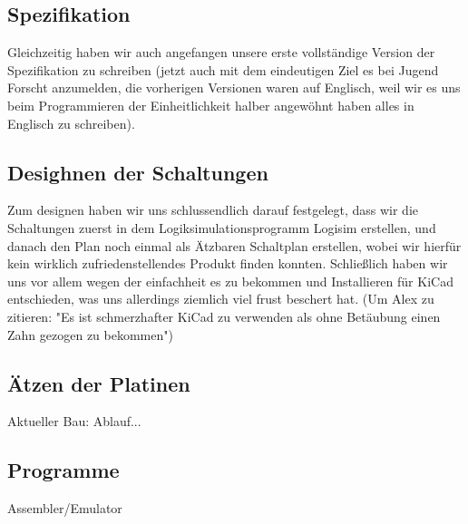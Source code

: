 \documentclass{scrartcl}
\begin{document}
    \subsection{Spezifikation}
    Gleichzeitig haben wir auch angefangen unsere erste vollständige Version der Spezifikation zu schreiben (jetzt auch mit dem eindeutigen Ziel es bei Jugend Forscht anzumelden, die vorherigen Versionen waren auf Englisch, weil wir es uns beim Programmieren der Einheitlichkeit halber angewöhnt haben alles in Englisch zu schreiben).

    \subsection{Desighnen der Schaltungen}

    Zum designen haben wir uns schlussendlich darauf festgelegt, dass wir die Schaltungen zuerst in dem Logiksimulationsprogramm Logisim erstellen,
    und danach den Plan noch einmal als Ätzbaren Schaltplan erstellen, wobei wir hierfür kein wirklich zufriedenstellendes Produkt finden konnten.
    Schließlich haben wir uns vor allem wegen der einfachheit es zu bekommen und Installieren für KiCad entschieden, was uns allerdings ziemlich viel frust beschert hat.
    (Um Alex zu zitieren: "Es ist schmerzhafter KiCad zu verwenden als ohne Betäubung einen Zahn gezogen zu bekommen") %

    \subsection{Ätzen der Platinen}
    Aktueller Bau: Ablauf...
    \subsection{Programme}
    Assembler/Emulator
\end{document}
